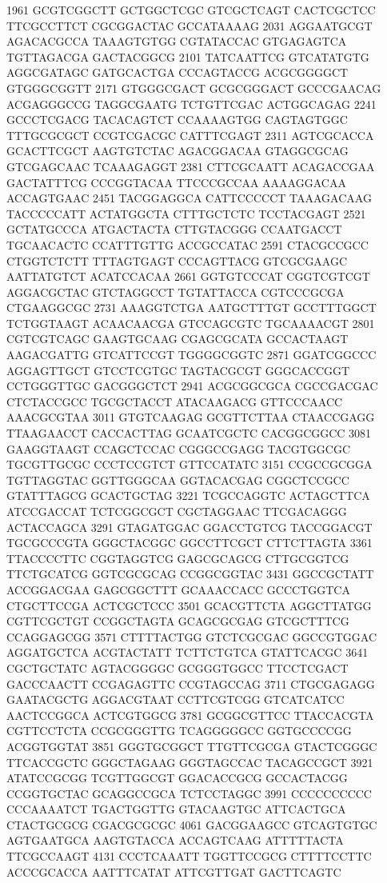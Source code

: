 \begin{addmargin}{0.025\textwidth}
\begin{footnotesize}
\begin{LVerbatim}[commandchars=\\\{\}]
1961 GCGTCGGCTT GCTGGCTCGC GTCGCTCAGT CACTCGCTCC TTCGCCTTCT CGCGGACTAC GCCATAAAAG
2031 AGGAATGCGT AGACACGCCA TAAAGTGTGG CGTATACCAC GTGAGAGTCA TGTTAGACGA GACTACGGCG
2101 TATCAATTCG GTCATATGTG AGGCGATAGC GATGCACTGA CCCAGTACCG ACGCGGGGCT GTGGGCGGTT
2171 GTGGGCGACT GCGCGGGACT GCCCGAACAG ACGAGGGCCG TAGGCGAATG TCTGTTCGAC ACTGGCAGAG
2241 GCCCTCGACG TACACAGTCT CCAAAAGTGG CAGTAGTGGC TTTGCGCGCT CCGTCGACGC CATTTCGAGT
2311 AGTCGCACCA GCACTTCGCT AAGTGTCTAC AGACGGACAA GTAGGCGCAG GTCGAGCAAC TCAAAGAGGT
2381 CTTCGCAATT ACAGACCGAA GACTATTTCG CCCGGTACAA TTCCCGCCAA AAAAGGACAA ACCAGTGAAC
2451 TACGGAGGCA CATTCCCCCT TAAAGACAAG TACCCCCATT ACTATGGCTA CTTTGCTCTC TCCTACGAGT
2521 GCTATGCCCA ATGACTACTA CTTGTACGGG CCAATGACCT TGCAACACTC CCATTTGTTG ACCGCCATAC
2591 CTACGCCGCC CTGGTCTCTT TTTAGTGAGT CCCAGTTACG GTCGCGAAGC AATTATGTCT ACATCCACAA
2661 GGTGTCCCAT CGGTCGTCGT AGGACGCTAC GTCTAGGCCT TGTATTACCA CGTCCCGCGA CTGAAGGCGC
2731 AAAGGTCTGA AATGCTTTGT GCCTTTGGCT TCTGGTAAGT ACAACAACGA GTCCAGCGTC TGCAAAACGT
2801 CGTCGTCAGC GAAGTGCAAG CGAGCGCATA GCCACTAAGT AAGACGATTG GTCATTCCGT TGGGGCGGTC
2871 GGATCGGCCC AGGAGTTGCT GTCCTCGTGC TAGTACGCGT GGGCACCGGT CCTGGGTTGC GACGGGCTCT
2941 ACGCGGCGCA CGCCGACGAC CTCTACCGCC TGCGCTACCT ATACAAGACG GTTCCCAACC AAACGCGTAA
3011 GTGTCAAGAG GCGTTCTTAA CTAACCGAGG TTAAGAACCT CACCACTTAG GCAATCGCTC CACGGCGGCC
3081 GAAGGTAAGT CCAGCTCCAC CGGGCCGAGG TACGTGGCGC TGCGTTGCGC CCCTCCGTCT GTTCCATATC
3151 CCGCCGCGGA TGTTAGGTAC GGTTGGGCAA GGTACACGAG CGGCTCCGCC GTATTTAGCG GCACTGCTAG
3221 TCGCCAGGTC ACTAGCTTCA ATCCGACCAT TCTCGGCGCT CGCTAGGAAC TTCGACAGGG ACTACCAGCA
3291 GTAGATGGAC GGACCTGTCG TACCGGACGT TGCGCCCGTA GGGCTACGGC GGCCTTCGCT CTTCTTAGTA
3361 TTACCCCTTC CGGTAGGTCG GAGCGCAGCG CTTGCGGTCG TTCTGCATCG GGTCGCGCAG CCGGCGGTAC
3431 GGCCGCTATT ACCGGACGAA GAGCGGCTTT GCAAACCACC GCCCTGGTCA CTGCTTCCGA ACTCGCTCCC
3501 GCACGTTCTA AGGCTTATGG CGTTCGCTGT CCGGCTAGTA GCAGCGCGAG GTCGCTTTCG CCAGGAGCGG
3571 CTTTTACTGG GTCTCGCGAC GGCCGTGGAC AGGATGCTCA ACGTACTATT TCTTCTGTCA GTATTCACGC
3641 CGCTGCTATC AGTACGGGGC GCGGGTGGCC TTCCTCGACT GACCCAACTT CCGAGAGTTC CCGTAGCCAG
3711 CTGCGAGAGG GAATACGCTG AGGACGTAAT CCTTCGTCGG GTCATCATCC AACTCCGGCA ACTCGTGGCG
3781 GCGGCGTTCC TTACCACGTA CGTTCCTCTA CCGCGGGTTG TCAGGGGGCC GGTGCCCCGG ACGGTGGTAT
3851 GGGTGCGGCT TTGTTCGCGA GTACTCGGGC TTCACCGCTC GGGCTAGAAG GGGTAGCCAC TACAGCCGCT
3921 ATATCCGCGG TCGTTGGCGT GGACACCGCG GCCACTACGG CCGGTGCTAC GCAGGCCGCA TCTCCTAGGC
3991 CCCCCCCCCC CCC\color{red}AAAATCT TGACTGGTTG GTACAAGTGC ATTCACTGCA CTACTGCGCG CGACGCGCGC
\color{red}4061 GACGGAAGCC GTCAGTGTGC AGTGAATGCA AAGTGTACCA ACCAGTCAAG ATTTTTACTA TTCGCCAAGT
\color{red}4131 CCCTCAAATT TGGTTCCGCG CTTTTCCTTC ACCCGCACCA AATTTCATAT ATTCGTTGAT GACTTCAGTC

\end{LVerbatim}
\end{footnotesize}
\end{addmargin}
